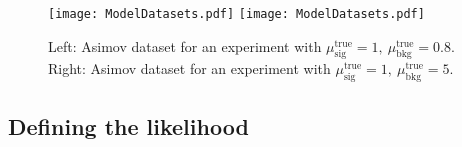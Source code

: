 
\begin{figure}[t!]
\centering
\texttt{[image: ModelDatasets.pdf]}
\texttt{[image: ModelDatasets.pdf]}
\caption{Left: Asimov dataset for an experiment with $\mu_\text{sig}^\text{true}=1,~\mu_\text{bkg}^\text{true}=0.8$. Right: Asimov dataset for an experiment with $\mu_\text{sig}^\text{true}=1,~\mu_\text{bkg}^\text{true}=5$.}
\label{F. Asimovs}
\end{figure}





\subsection{Defining the likelihood}
\label{S. CLsInAction::Likelihood}

